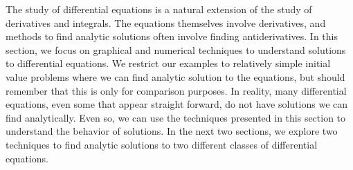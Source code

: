 
The study of differential equations is a natural extension of the study of derivatives and integrals.  The equations themselves involve derivatives, and methods to find analytic solutions often involve finding antiderivatives.   In this section, we focus on graphical and numerical techniques to understand solutions to differential equations.  We restrict our examples to relatively simple initial value problems where we can find analytic solution to the equations, but should remember that this is only for comparison purposes.  In reality, many differential equations, even some that appear straight forward, do not have solutions we can find analytically.  Even so, we can use the techniques presented in this section to understand the behavior of solutions.  In the next two sections, we explore two techniques to find analytic solutions to two different classes of differential equations.

